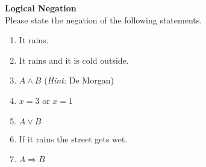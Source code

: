 \textbf{Logical Negation}\\
Please state the negation of the following statements.
\begin{enumerate}
	\item It rains.
	\item It rains and it is cold outside.
	\item $A \land B$ 
	(\textit{Hint: }De Morgan)
	\item $x = 3 $ or $x = 1$
	\item $A \lor B$
	\item If it rains the street gets wet.
	\item $A \Rightarrow B$ 
\end{enumerate}